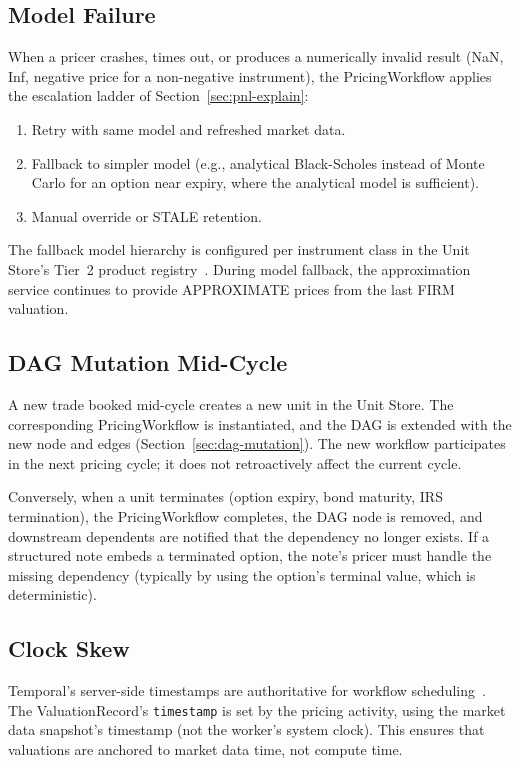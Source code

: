 \documentclass[11pt,a4paper]{article}
\begin{document}
\subsection{Model Failure}

When a pricer crashes, times out, or produces a numerically invalid result (NaN, Inf, negative price for a non-negative instrument), the PricingWorkflow applies the escalation ladder of Section~\ref{sec:pnl-explain}:

\begin{enumerate}[nosep]
\item Retry with same model and refreshed market data.
\item Fallback to simpler model (e.g., analytical Black-Scholes instead of Monte Carlo for an option near expiry, where the analytical model is sufficient).
\item Manual override or STALE retention.
\end{enumerate}

\noindent The fallback model hierarchy is configured per instrument class in the Unit Store's Tier~2 product registry~\cite[\S3.2.2]{ledger}.  During model fallback, the approximation service continues to provide APPROXIMATE prices from the last FIRM valuation.

\subsection{DAG Mutation Mid-Cycle}

A new trade booked mid-cycle creates a new unit in the Unit Store.  The corresponding PricingWorkflow is instantiated, and the DAG is extended with the new node and edges (Section~\ref{sec:dag-mutation}).  The new workflow participates in the next pricing cycle; it does not retroactively affect the current cycle.

Conversely, when a unit terminates (option expiry, bond maturity, IRS termination), the PricingWorkflow completes, the DAG node is removed, and downstream dependents are notified that the dependency no longer exists.  If a structured note embeds a terminated option, the note's pricer must handle the missing dependency (typically by using the option's terminal value, which is deterministic).

\subsection{Clock Skew}

Temporal's server-side timestamps are authoritative for workflow scheduling~\cite[\S14]{ledger}.  The ValuationRecord's \texttt{timestamp} is set by the pricing activity, using the market data snapshot's timestamp (not the worker's system clock).  This ensures that valuations are anchored to market data time, not compute time.
\end{document}
